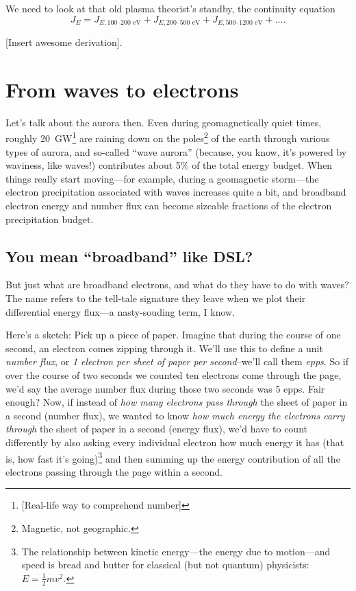 We need to look at that old plasma theorist's standby, the continuity
equation
\begin{equation}
  \label{ch1:eqCont}
  J_{E} = J_{E,\textrm{100--200 eV}} + J_{E,\textrm{200--500 eV}} + J_{E,\textrm{500--1200 eV}} + \dots .
\end{equation}

[Insert awesome derivation].

\section{From waves to electrons}

Let's talk about the aurora then. Even during geomagnetically quiet
times, roughly 20~GW\footnote{[Real-life way to comprehend number]}
\citep{Newell2009} are raining down on the poles\footnote{Magnetic, not geographic.} of the
earth through various types of aurora, and so-called ``wave aurora''
(because, you know, it's powered by waviness, like \Alf waves!)
contributes about 5\% of the total energy budget. When things really
start moving---for example, during a geomagnetic storm---the electron
precipitation associated with \Alf waves increases quite a bit, and
broadband electron energy and number flux can become sizeable
fractions of the electron precipitation budget.

\subsection{You mean ``broadband'' like DSL?}

But just what are broadband electrons, and what do they have to do
with \Alf waves? The name refers to the tell-tale signature they leave
when we plot their differential energy flux---a nasty-souding term, I
know.

Here's a sketch: Pick up a piece of paper. Imagine that during the
course of one second, an electron comes zipping through it. We'll use
this to define a unit \emph{number flux}, or \emph {1 electron per
  sheet of paper per second}--we'll call them \emph{epps}. So if over
the course of two seconds we counted ten electrons come through the
page, we'd say the average number flux during those two seconds was 5
epps. Fair enough?  Now, if instead of \emph{how many electrons pass
  through} the sheet of paper in a second (number flux), we wanted to
know \emph{how much energy the electrons carry through} the sheet of
paper in a second (energy flux), we'd have to count differently by
also asking every individual electron how much energy it has (that is,
how fast it's going)\footnote{The relationship between kinetic
  energy---the energy due to motion---and speed is bread and butter
  for classical (but not quantum) physicists: $E = \frac{1}{2}m v^2.$}
and then summing up the energy contribution of all the electrons
passing through the page within a second.

